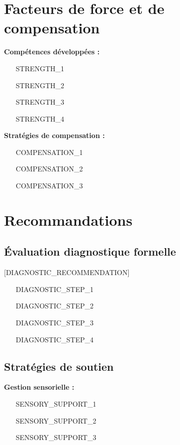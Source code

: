 \documentclass[11pt,a4paper]{article}
\begin{document}
\section{Facteurs de force et de compensation}

\textbf{Compétences développées :}
\begin{itemize}[leftmargin=2cm]
\item [STRENGTH_1]
\item [STRENGTH_2]
\item [STRENGTH_3]
\item [STRENGTH_4]
\end{itemize}

\textbf{Stratégies de compensation :}
\begin{itemize}[leftmargin=2cm]
\item [COMPENSATION_1]
\item [COMPENSATION_2]
\item [COMPENSATION_3]
\end{itemize}

\section{Recommandations}

\subsection{Évaluation diagnostique formelle}

[DIAGNOSTIC_RECOMMENDATION]

\begin{itemize}[leftmargin=2cm]
\item [DIAGNOSTIC_STEP_1]
\item [DIAGNOSTIC_STEP_2]
\item [DIAGNOSTIC_STEP_3]
\item [DIAGNOSTIC_STEP_4]
\end{itemize}

\subsection{Stratégies de soutien}

\textbf{Gestion sensorielle :}
\begin{itemize}[leftmargin=2cm]
\item [SENSORY_SUPPORT_1]
\item [SENSORY_SUPPORT_2]
\item [SENSORY_SUPPORT_3]
\end{itemize}
\end{document}
